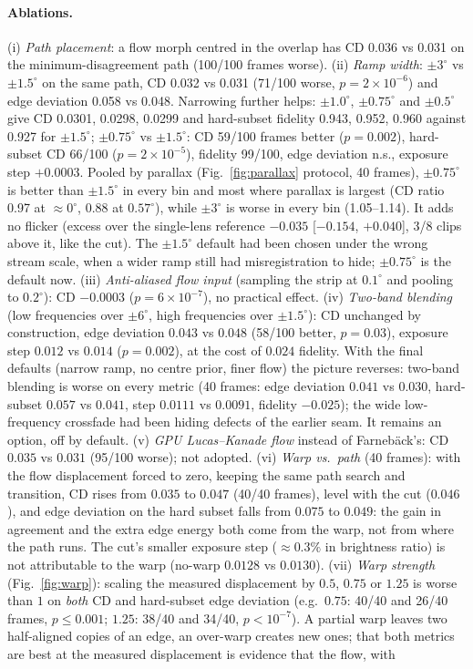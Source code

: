 \documentclass[11pt]{article}
\begin{document}
\paragraph{Ablations.} (i) \emph{Path placement}: a flow morph centred in the overlap has CD 0.036 vs 0.031 on the minimum-disagreement path (100/100 frames worse). (ii) \emph{Ramp width}: $\pm3^\circ$ vs $\pm1.5^\circ$ on the same path, CD 0.032 vs 0.031 (71/100 worse, $p=2\times10^{-6}$) and edge deviation 0.058 vs 0.048. Narrowing further helps: $\pm1.0^\circ$, $\pm0.75^\circ$ and $\pm0.5^\circ$ give CD 0.0301, 0.0298, 0.0299 and hard-subset fidelity 0.943, 0.952, 0.960 against 0.927 for $\pm1.5^\circ$; $\pm0.75^\circ$ vs $\pm1.5^\circ$: CD 59/100 frames better ($p=0.002$), hard-subset CD 66/100 ($p=2\times10^{-5}$), fidelity 99/100, edge deviation n.s., exposure step $+0.0003$. Pooled by parallax (Fig.~\ref{fig:parallax} protocol, 40 frames), $\pm0.75^\circ$ is better than $\pm1.5^\circ$ in every bin and most where parallax is largest (CD ratio 0.97 at $\approx0^\circ$, 0.88 at $0.57^\circ$), while $\pm3^\circ$ is worse in every bin (1.05--1.14). It adds no flicker (excess over the single-lens reference $-0.035$ [$-0.154$, $+0.040$], 3/8 clips above it, like the cut). The $\pm1.5^\circ$ default had been chosen under the wrong stream scale, when a wider ramp still had misregistration to hide; $\pm0.75^\circ$ is the default now. (iii) \emph{Anti-aliased flow input} (sampling the strip at $0.1^\circ$ and pooling to $0.2^\circ$): CD $-0.0003$ ($p=6\times10^{-7}$), no practical effect. (iv) \emph{Two-band blending} (low frequencies over $\pm6^\circ$, high frequencies over $\pm1.5^\circ$): CD unchanged by construction, edge deviation $0.043$ vs $0.048$ (58/100 better, $p=0.03$), exposure step $0.012$ vs $0.014$ ($p=0.002$), at the cost of $0.024$ fidelity. With the final defaults (narrow ramp, no centre prior, finer flow) the picture reverses: two-band blending is worse on every metric (40 frames: edge deviation $0.041$ vs $0.030$, hard-subset $0.057$ vs $0.041$, step $0.0111$ vs $0.0091$, fidelity $-0.025$); the wide low-frequency crossfade had been hiding defects of the earlier seam. It remains an option, off by default. (v) \emph{GPU Lucas--Kanade flow} instead of Farneb\"ack's: CD $0.035$ vs $0.031$ (95/100 worse); not adopted. (vi) \emph{Warp vs.\ path} (40 frames): with the flow displacement forced to zero, keeping the same path search and transition, CD rises from $0.035$ to $0.047$ (40/40 frames), level with the cut ($0.046$), and edge deviation on the hard subset falls from $0.075$ to $0.049$: the gain in agreement and the extra edge energy both come from the warp, not from where the path runs. The cut's smaller exposure step ($\approx0.3\%$ in brightness ratio) is not attributable to the warp (no-warp $0.0128$ vs $0.0130$). (vii) \emph{Warp strength} (Fig.~\ref{fig:warp}): scaling the measured displacement by $0.5$, $0.75$ or $1.25$ is worse than $1$ on \emph{both} CD and hard-subset edge deviation (e.g.\ $0.75$: 40/40 and 26/40 frames, $p\le0.001$; $1.25$: 38/40 and 34/40, $p<10^{-7}$). A partial warp leaves two half-aligned copies of an edge, an over-warp creates new ones; that both metrics are best at the measured displacement is evidence that the flow, with 
\end{document}
